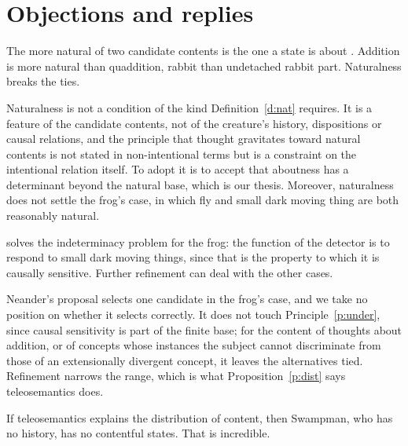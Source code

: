 \documentclass{situationist-preprint}
\begin{document}
\section{Objections and replies}

\begin{objection}
The more natural of two candidate contents is the one a state is about \citep{Lewis1983}. Addition is more natural than quaddition, rabbit than undetached rabbit part. Naturalness breaks the ties.
\end{objection}

\begin{reply}
Naturalness is not a condition of the kind Definition~\ref{d:nat} requires. It is a feature of the candidate contents, not of the creature's history, dispositions or causal relations, and the principle that thought gravitates toward natural contents is not stated in non-intentional terms but is a constraint on the intentional relation itself. To adopt it is to accept that aboutness has a determinant beyond the natural base, which is our thesis. Moreover, naturalness does not settle the frog's case, in which fly and small dark moving thing are both reasonably natural.
\end{reply}

\begin{objection}
\citet{Neander2017} solves the indeterminacy problem for the frog: the function of the detector is to respond to small dark moving things, since that is the property to which it is causally sensitive. Further refinement can deal with the other cases.
\end{objection}

\begin{reply}
Neander's proposal selects one candidate in the frog's case, and we take no position on whether it selects correctly. It does not touch Principle~\ref{p:under}, since causal sensitivity is part of the finite base; for the content of thoughts about addition, or of concepts whose instances the subject cannot discriminate from those of an extensionally divergent concept, it leaves the alternatives tied. Refinement narrows the range, which is what Proposition~\ref{p:dist} says teleosemantics does.
\end{reply}

\begin{objection}[Swampman]
If teleosemantics explains the distribution of content, then Swampman, who has no history, has no contentful states. That is incredible.
\end{objection}
\end{document}
